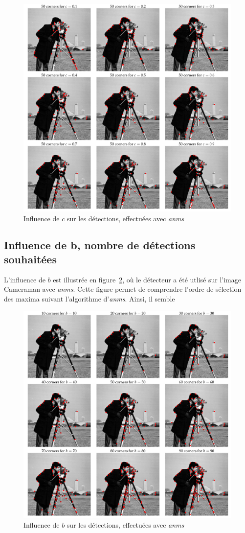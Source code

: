 \documentclass[12pt,a4paper,onecolumn]{article}
\begin{document}
\begin{figure}[H]
	\centering
	\includegraphics[width = 1.0\textwidth]{2_cameraman_c}
	\caption{Influence de \(c\) sur les détections, effectuées avec \textit{anms}}
	\label{fig_2_c}
\end{figure}

\subsection{Influence de b, nombre de détections souhaitées}

L'influence de \(b\) est illustrée en figure~\ref{fig_2_b}, où le détecteur a été utlisé sur l'image Cameraman avec \textit{anms}. Cette figure permet de comprendre l'ordre de sélection des maxima suivant l'algorithme d'\textit{anms}. Ainsi, il semble

\begin{figure}[H]
	\centering
	\includegraphics[width = 1.0\textwidth]{2_cameraman_b}
	\caption{Influence de \(b\) sur les détections, effectuées avec \textit{anms}}
	\label{fig_2_b}
\end{figure}
\end{document}
